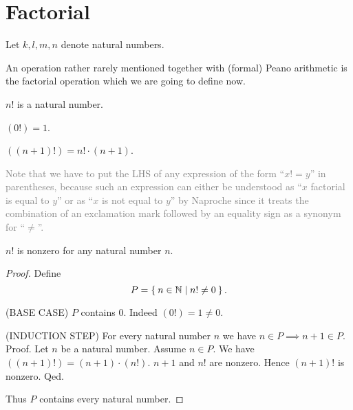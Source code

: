 \documentclass[../../arithmetic.tex]{subfiles}
\begin{document}
  \section{Factorial}

  \begin{forthel}
  \end{forthel}

  \begin{forthel}
    Let $k, l, m, n$ denote natural numbers.
  \end{forthel}

  \noindent An operation rather rarely mentioned together with (formal) Peano
  arithmetic is the factorial operation which we are going to define now.

  \begin{forthel}
    \begin{signature}
      $n!$ is a natural number.
    \end{signature}

    \begin{axiom}\label{Arithmetic_01_05_169222}
      $(0!) = 1$.
    \end{axiom}

    \begin{axiom}\label{Arithmetic_01_05_539010}
      $((n + 1)!) = n! \cdot (n + 1)$.
    \end{axiom}
  \end{forthel}

  \noindent \textcolor{gray}{Note that we have to put the LHS of any expression
  of the form \enquote{$x! = y$} in parentheses, because such an expression can
  either be understood as \enquote{$x$ factorial is equal to $y$} or as
  \enquote{$x$ is not equal to $y$} by Naproche since it treats the combination
  of an exclamation mark followed by an equality sign as a synonym for
  \enquote{$\neq$}.}

  \begin{forthel}
    \begin{proposition}\label{Arithmetic_01_05_473272}
      $n!$ is nonzero for any natural number $n$.
    \end{proposition}
    \begin{proof}
      Define \[ P = \Set{n \in \mathbb{N} | n! \neq 0}. \]

      (BASE CASE) $P$ contains $0$.
      Indeed $(0!) = 1 \neq 0$.

      (INDUCTION STEP) For every natural number $n$ we have $n \in P \implies n + 1 \in P$. \\
      Proof.
        Let $n$ be a natural number.
        Assume $n \in P$.
        We have $((n + 1)!) = (n + 1) \cdot (n!)$.
        $n + 1$ and $n!$ are nonzero.
        Hence $(n + 1)!$ is nonzero.
      Qed.

      Thus $P$ contains every natural number.
    \end{proof}
  \end{forthel}
\end{document}
